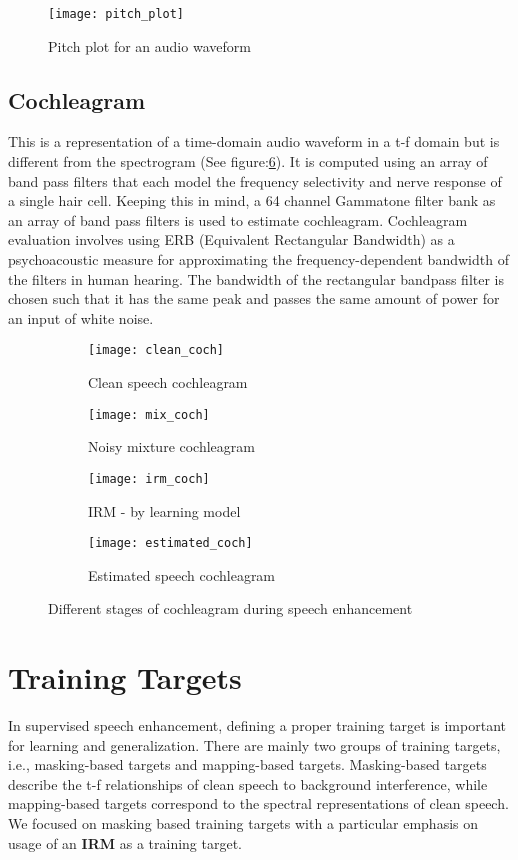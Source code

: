 \begin{figure}
\centering
\texttt{[image: pitch\_plot]}
\caption{Pitch plot for an audio waveform}
\label{fig:pitch_plot}
\end{figure}

\subsection{\textbf{Cochleagram}}
This is a representation of a  time-domain audio waveform in a t-f domain but is different from the spectrogram (See figure:\ref{fig:coch}). It is computed using an array of band pass filters that each model the frequency selectivity and nerve response of a single hair cell. Keeping this in mind, a 64 channel Gammatone filter bank as an array of band pass filters is used to estimate cochleagram.
Cochleagram evaluation involves using ERB (Equivalent Rectangular Bandwidth) as a psychoacoustic measure for approximating the frequency-dependent bandwidth of the filters in human hearing. The bandwidth of the rectangular bandpass filter is chosen such that it has the same peak and passes the same amount of power for an input of white noise.
\begin{figure}
\centering
\begin{subfigure}{.4\textwidth}
  \centering
  \texttt{[image: clean\_coch]}
  \caption{Clean speech cochleagram}
  \label{fig:clean_coch}
\end{subfigure}%
\begin{subfigure}{.4\textwidth}
  \centering
  \texttt{[image: mix\_coch]}
  \caption{Noisy mixture cochleagram}
  \label{fig:mix_coch}
\end{subfigure}
\begin{subfigure}{.4\textwidth}
  \centering
  \texttt{[image: irm\_coch]}
  \caption{IRM - by learning model}
  \label{fig:irm_coch}
\end{subfigure}
\begin{subfigure}{.4\textwidth}
  \centering
  \texttt{[image: estimated\_coch]}
  \caption{Estimated speech cochleagram}
  \label{fig:estimated_coch}
\end{subfigure}
\caption{Different stages of cochleagram during speech enhancement}
\label{fig:coch}
\end{figure}

\section{Training Targets}
In supervised speech enhancement, defining a proper training target is important for learning and generalization. There are mainly two groups of training targets, i.e., masking-based targets and mapping-based targets. Masking-based targets describe the t-f relationships of clean speech to background interference, while mapping-based targets correspond to the spectral representations of clean speech. We focused on masking based training targets with a particular emphasis on usage of an \textbf{IRM} as a training target.\\
